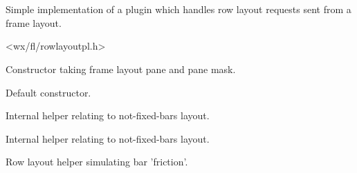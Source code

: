 %
%


\section{}\label{cbrowlayoutplugin}


Simple implementation of a plugin which handles row layout
requests sent from a frame layout.




<wx/fl/rowlayoutpl.h>




\label{cbrowlayoutplugincbrowlayoutplugin}


Constructor taking frame layout pane and pane mask.



Default constructor.


\label{cbrowlayoutpluginadjustlengthofinserted}


Internal helper relating to not-fixed-bars layout.


\label{cbrowlayoutpluginapplylengthratios}


Internal helper relating to not-fixed-bars layout.


\label{cbrowlayoutplugincalcrowheight}


Row layout helper simulating bar 'friction'.


\label{cbrowlayoutplugincheckifattheboundary}

